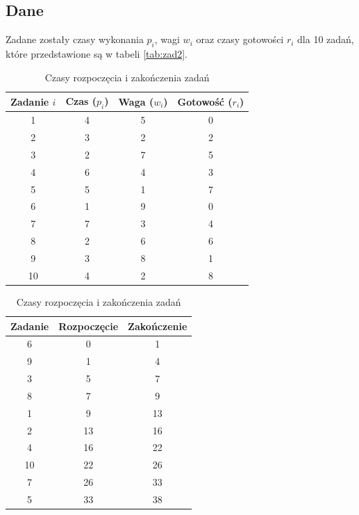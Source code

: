 \documentclass{article}
\begin{document}
\subsection{Dane}
Zadane zostały czasy wykonania $p_i$, wagi $w_i$ oraz czasy gotowości $r_i$ dla 10 zadań, które przedstawione są w tabeli \ref{tab:zad2}.
\begin{table}[h]
    \centering
    \begin{minipage}{0.45\textwidth}
        \centering
        \begin{tabular}{c|c|c|c}
            Zadanie $i$ & Czas ($p_i$) & Waga ($w_i$) & Gotowość ($r_i$) \\
            \hline
            1 & 4 & 5 & 0 \\
            2 & 3 & 2 & 2 \\
            3 & 2 & 7 & 5 \\
            4 & 6 & 4 & 3 \\
            5 & 5 & 1 & 7 \\
            6 & 1 & 9 & 0 \\
            7 & 7 & 3 & 4 \\
            8 & 2 & 6 & 6 \\
            9 & 3 & 8 & 1 \\
            10 & 4 & 2 & 8 \\
        \end{tabular}
        \caption{Parametry zadań: $p_i$, $w_i$, $r_i$}
        \label{tab:zad2}
    \end{minipage}
    \hfill
    \begin{minipage}{0.45\textwidth}
        \centering
        \begin{tabular}{c|c|c}
            Zadanie & Rozpoczęcie & Zakończenie \\
            \hline
            6 & 0 & 1 \\
            9 & 1 & 4 \\
            3 & 5 & 7 \\
            8 & 7 & 9 \\
            1 & 9 & 13 \\
            2 & 13 & 16 \\
            4 & 16 & 22 \\
            10 & 22 & 26 \\
            7 & 26 & 33 \\
            5 & 33 & 38 \\
        \end{tabular}
        \caption{Czasy rozpoczęcia i zakończenia zadań}
        \label{tab:zad2b}
    \end{minipage}
\end{table}
\end{document}
